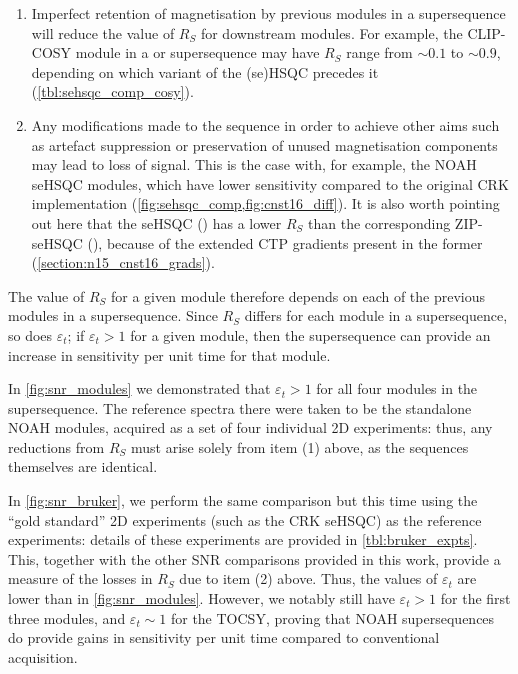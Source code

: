 \begin{enumerate}
    \item Imperfect retention of magnetisation by previous modules in a supersequence will reduce the value of $R_S$ for downstream modules.
        For example, the CLIP-COSY module in a  or  supersequence may have $R_S$ range from $\sim 0.1$ to $\sim 0.9$, depending on which variant of the (se)HSQC precedes it (\cref{tbl:sehsqc_comp_cosy}).
    \item Any modifications made to the sequence in order to achieve other aims such as artefact suppression or preservation of unused magnetisation components may lead to loss of signal.
        This is the case with, for example, the NOAH seHSQC modules, which have lower sensitivity compared to the original CRK implementation (\cref{fig:sehsqc_comp,fig:cnst16_diff}).
        It is also worth pointing out here that the \nitrogen{} seHSQC (\noahSpn{}) has a lower $R_S$ than the corresponding \carbon{} ZIP-seHSQC (\noahSpb{}), because of the extended CTP gradients present in the former (\cref{section:n15_cnst16_grads}).
\end{enumerate}

The value of $R_S$ for a given module therefore depends on each of the previous modules in a supersequence.
Since $R_S$ differs for each module in a supersequence, so does $\varepsilon_t$; if $\varepsilon_t > 1$ for a given module, then the supersequence can provide an increase in sensitivity per unit time for that module.

In \cref{fig:snr_modules} we demonstrated that $\varepsilon_t > 1$ for all four modules in the  supersequence.
The reference spectra there were taken to be the standalone NOAH modules, acquired as a set of four individual 2D experiments: thus, any reductions from $R_S$ must arise solely from item (1) above, as the sequences themselves are identical.

In \cref{fig:snr_bruker}, we perform the same comparison but this time using the ``gold standard'' 2D experiments (such as the CRK seHSQC) as the reference experiments: details of these experiments are provided in \cref{tbl:bruker_expts}.
This, together with the other SNR comparisons provided in this work, provide a measure of the losses in $R_S$ due to item (2) above.
Thus, the values of $\varepsilon_t$ are lower than in \cref{fig:snr_modules}.
However, we notably still have $\varepsilon_t > 1$ for the first three modules, and $\varepsilon_t \sim 1$ for the TOCSY, proving that NOAH supersequences do provide gains in sensitivity per unit time compared to conventional acquisition.

